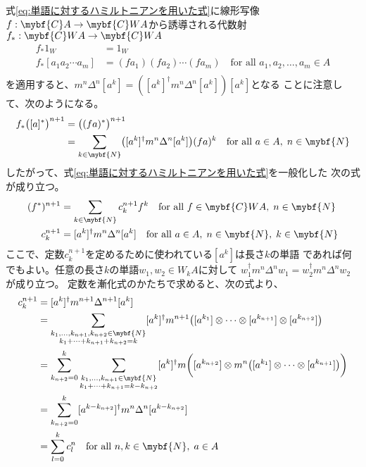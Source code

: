 	式\eqref{eq:単語に対するハミルトニアンを用いた式}に線形写像
	$f:\mybf{C}A\to \mybf{C}WA$から誘導される代数射
	$f_*:\mybf{C}WA\to\mybf{C}WA$
	\begin{equation*}\begin{split} %
		f_*1_W &= 1_W \\
		f_*[a_1a_2\cdots a_m] &= (fa_1)(fa_2)\cdots(fa_m)
		\quad\text{for all }a_1,a_2,\dots,a_m\in A \\
	\end{split}\end{equation*} %
	を適用すると、$m^n\Delta^n[a^k]=([a^k]^\dag m^n\Delta^n[a^k])[a^k]$となる
	ことに注意して、次のようになる。
	\begin{equation*}\begin{split} %
		f_*\bigl([a]^*\bigr)^{n+1} &= \bigl((fa)^*\bigr)^{n+1} \\
		&= \sum_{k\in\mybf{N}}\bigl([a^k]^\dag m^n\Delta^n[a^k]\bigr)(fa)^k
		\quad\text{for all }a\in A,\;n\in\mybf{N} \\
	\end{split}\end{equation*} %
	したがって、式\eqref{eq:単語に対するハミルトニアンを用いた式}を一般化した
	次の式が成り立つ。
	\begin{equation*}\begin{split} %
		(f^*)^{n+1} 
		&= \sum_{k\in\mybf{N}}c^{n+1}_kf^k
		\quad\text{for all }f\in\mybf{C}WA,\; n\in\mybf{N} \\
		c^{n+1}_k
		&= [a^k]^\dag m^n\Delta^n[a^k]
		\quad\text{for all }a\in A,\; n\in\mybf{N},\;k\in\mybf{N} \\
	\end{split}\end{equation*} %
	ここで、定数$c^{n+1}_k$を定めるために使われている$[a^k]$は長さ$k$の単語
	であれば何でもよい。任意の長さ$k$の単語$w_1,w_2\in W_kA$に対して
	$w_1^\dag m^n\Delta^nw_1=w_2^\dag m^n\Delta^nw_2$が成り立つ。
	定数を漸化式のかたちで求めると、次の式より、
	\begin{equation*}\begin{split} %
		c^{n+1}_k &= [a^k]^\dag m^{n+1}\Delta^{n+1}[a^k]
		\\
		&= \sum_{\substack{k_1,\dots,k_{n+1},k_{n+2}\in\mybf{N} \\
			k_1+\cdots+k_{n+1}+k_{n+2}=k
		}} [a^k]^\dag m^{n+1}\bigl(
			[a^{k_1}]\otimes\cdots\otimes[a^{k_{n+1}}]\otimes[a^{k_{n+2}}]
		\bigr)
		\\
		&= \sum_{k_{n+2}=0}^k \sum_{\substack{k_1,\dots,k_{n+1}\in\mybf{N} \\
			k_1+\cdots+k_{n+1}=k-k_{n+2}
		}} [a^k]^\dag m\biggl([a^{k_{n+2}}]\otimes
			m^n\bigl([a^{k_1}]\otimes\cdots\otimes[a^{k_{n+1}}]\bigr)\biggr)
		\\
		&= \sum_{k_{n+2}=0}^k [a^{k-k_{n+2}}]^\dag m^n\Delta^n[a^{k-k_{n+2}}]
		\\
		&= \sum_{l=0}^k c^n_l \quad\text{for all }n,k\in\mybf{N},\;a\in A
	\end{split}\end{equation*} %
